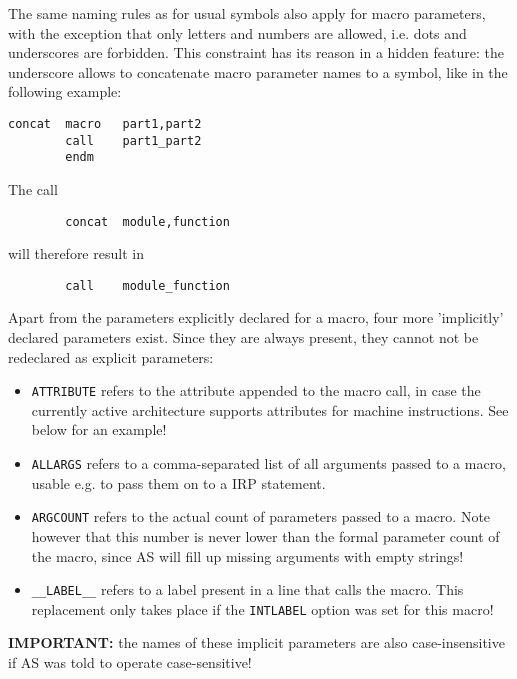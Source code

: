 \documentclass[12pt,twoside]{report}
\begin{document}
The same naming rules as for usual symbols also apply for macro
parameters, with the exception that only letters and numbers are
allowed, i.e. dots and underscores are forbidden.  This constraint
has its reason in a hidden feature: the underscore allows to
concatenate macro parameter names to a symbol, like in the following
example:
\begin{verbatim}
concat  macro   part1,part2
        call    part1_part2
        endm
\end{verbatim}
The call
\begin{verbatim}
        concat  module,function
\end{verbatim}
will therefore result in
\begin{verbatim}
        call    module_function
\end{verbatim}
Apart from the parameters explicitly declared for a macro, four more
'implicitly' declared parameters exist.   Since they are always present,
they cannot not be redeclared as explicit parameters:
\begin{itemize}
\item{{\tt ATTRIBUTE} refers to the attribute appended to the macro call,
      in case the currently active architecture supports attributes for
      machine instructions.  See below for an example!}
\item{{\tt ALLARGS} refers to a comma-separated list of all arguments
      passed to a macro, usable e.g. to pass them on to a IRP statement.}
\item{{\tt ARGCOUNT} refers to the actual count of parameters passed to
      a macro.  Note however that this number is never lower than the
      formal parameter count of the macro, since AS will fill up missing
      arguments with empty strings!}
\item{{\tt \_\_LABEL\_\_} refers to a label present in a line that calls the
      macro. This replacement only takes place if the {\tt INTLABEL}
      option was set for this macro!}
\end{itemize}
{\bf IMPORTANT:} the names of these implicit parameters are also
case-insensitive if AS was told to operate case-sensitive!
\end{document}
